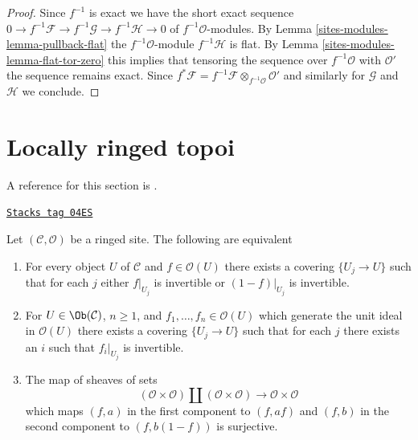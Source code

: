 \begin{proof}
Since $f^{-1}$ is exact we have the short exact sequence
$0 \to f^{-1}\mathcal{F} \to f^{-1}\mathcal{G} \to f^{-1}\mathcal{H} \to 0$
of $f^{-1}\mathcal{O}$-modules. By
Lemma \ref{sites-modules-lemma-pullback-flat}
the $f^{-1}\mathcal{O}$-module $f^{-1}\mathcal{H}$ is flat. By
Lemma \ref{sites-modules-lemma-flat-tor-zero} this implies that tensoring the sequence
over $f^{-1}\mathcal{O}$ with $\mathcal{O}'$ the sequence
remains exact. Since
$f^*\mathcal{F} = f^{-1}\mathcal{F} \otimes_{f^{-1}\mathcal{O}} \mathcal{O}'$
and similarly for $\mathcal{G}$ and $\mathcal{H}$ we conclude.
\end{proof}

\section{Locally ringed topoi}
\label{sites-modules-section-locally-ringed}
A reference for this section is
\cite[Expos\'e IV, Exercice 13.9]{SGA4}.

\begin{lemma}
\label{sites-modules-lemma-locally-ringed}
\href{https://stacks.math.columbia.edu/tag/04ES}{\texttt{Stacks tag 04ES}}

Let $(\mathcal{C}, \mathcal{O})$ be a ringed site. The following
are equivalent
\begin{enumerate}
\item For every object $U$ of $\mathcal{C}$ and $f \in \mathcal{O}(U)$
there exists a covering $\{U_j \to U\}$ such that for each $j$
either $f|_{U_j}$ is invertible or $(1 - f)|_{U_j}$ is invertible.
\item For $U \in \Ob(\mathcal{C})$, $n \geq 1$, and
$f_1, \ldots, f_n \in \mathcal{O}(U)$ which generate the unit ideal
in $\mathcal{O}(U)$ there exists a covering $\{U_j \to U\}$
such that for each $j$ there exists an $i$ such that $f_i|_{U_j}$
is invertible.
\item The map of sheaves of sets
$$
(\mathcal{O} \times \mathcal{O})
\amalg
(\mathcal{O} \times \mathcal{O})
\longrightarrow
\mathcal{O} \times \mathcal{O}
$$
which maps $(f, a)$ in the first component to $(f, af)$ and
$(f, b)$ in the second component to $(f, b(1 - f))$ is surjective.
\end{enumerate}
\end{lemma}

